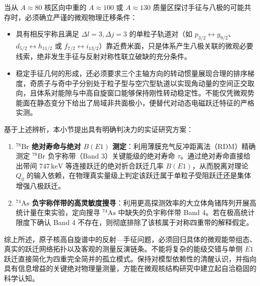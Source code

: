 当从 $A \approx 80$ 核区向中重的 $A \approx 100$ 或 $A \approx 130$ 质量区探讨手征与八极的可能共存时，必须确立严谨的微观物理迁移条件：
\begin{itemize}
\item 具有相反宇称且满足 $\Delta l = 3, \Delta j = 3$ 的单粒子轨道对（如 $p_{3/2} \leftrightarrow g_{9/2}$、$d_{5/2} \leftrightarrow h_{11/2}$ 或 $f_{7/2} \leftrightarrow i_{13/2}$）靠近费米面，只是体系产生八极关联的微观必要线索，绝非发生手征与反射对称性联立破缺的充分条件。
\item 稳定手征几何的形成，还必须要求三个主轴方向的转动惯量展现合理的排序梯度，奇质子与奇中子分别处于粒子型与空穴型轨道以实现角动量的空间正交取向，且体系对能隙与中高自旋窗口能够保持刚性转动稳定性。不能仅凭微观势能面在静态变分下给出了局域非共面极小，便替代对动态电磁跃迁特征的严格实测。
\end{itemize}

基于上述辨析，本小节提出具有明确判决力的实证研究方案：
\begin{enumerate}
\item \textbf{$^{78}\mathrm{Br}$ 绝对寿命与绝对 $B(E1)$ 测定}：利用薄膜充气反冲距离法（RDM）精确测定 $^{78}\mathrm{Br}$ 负宇称带（Band 3）关键能级的绝对寿命 $\tau$。通过绝对寿命直接给出带间 $747\,\mathrm{keV}$ 等连接跃迁的绝对折合跃迁几率 $B(E1)$，从而脱离对理论 $Q_0$ 的输入依赖，在物理真实量级上判定该跃迁属于单粒子受阻跃迁还是集体增强八极跃迁。
\item \textbf{$^{74}\mathrm{As}$ 负宇称伴带的高灵敏度搜寻}：利用更高探测效率的大立体角锗阵列开展高统计量在束实验，定向搜寻 $^{74}\mathrm{As}$ 中缺失的负宇称伴带 Band 4。若在极高统计限度下确认 Band 4 不存在，则彻底排除了该核属于对称四重带的解释假定。
\end{enumerate}

综上所述，原子核高自旋谱中的反射---手征问题，必须回归具体的微观能带组态、真实的跃迁网络拓扑以及客观的测量反演链条。不能将复杂的能级交错与单侧 $E1$ 跃迁直接简化为四重完全简并的孤立模式。保持对模型依赖性的清醒认识，并指向具有信息增益的关键绝对物理量测量，方能在微观核结构研究中建立起自洽稳固的科学认知。
